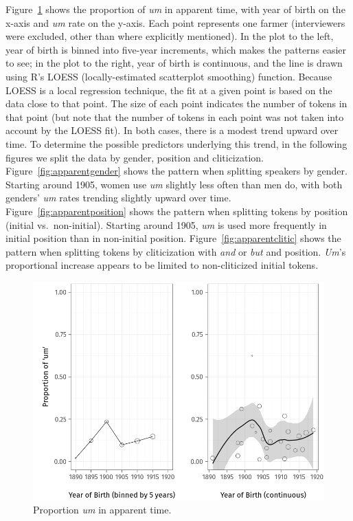 \documentclass[11pt]{article}
\begin{document}
Figure~\ref{fig:apparenttime} shows the proportion of \emph{um} in apparent
time, with year of birth on the x-axis and \emph{um} rate on the y-axis.
Each point represents one farmer (interviewers were excluded, other than where
explicitly mentioned).
In the plot to the left, year of birth is binned into five-year increments,
which makes the patterns easier to see;
in the plot to the right, year of birth is continuous, and the line is drawn
using R's LOESS (locally-estimated scatterplot smoothing) function.
Because LOESS is a local regression technique, the fit at a given point is based
on the data close to that point.
The size of each point indicates the number of tokens in that point (but note
that the number of tokens in each point was not taken into account by the
LOESS fit).
In both cases, there is a modest trend upward over time.
To determine the possible predictors underlying this trend, in the following
figures we split the data by gender, position and cliticization.
Figure~\ref{fig:apparentgender} shows the pattern when splitting speakers by
gender.
Starting around 1905, women use \emph{um} slightly less often than men do, with
both genders' \emph{um} rates trending slightly upward over time.
Figure~\ref{fig:apparentposition} shows the pattern when splitting tokens by
position (initial vs.\ non-initial).
Starting around 1905, \emph{um} is used more frequently in initial position than
in non-initial position.
Figure~\ref{fig:apparentclitic} shows the pattern when splitting tokens by
cliticization with \emph{and} or \emph{but} and position.
\emph{Um}'s proportional increase appears to be limited to non-cliticized
initial tokens.

\begin{figure}[htpb]
    \centering
    \includegraphics[width=0.8\linewidth]{figures/apparenttime.png}
    \caption{Proportion \emph{um} in apparent time.}
    \label{fig:apparenttime}
\end{figure}
\end{document}
